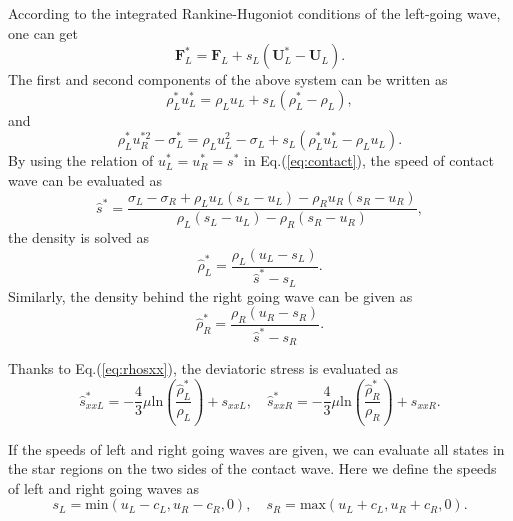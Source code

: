 \documentclass[review]{elsarticle}
\begin{document}
According to the integrated  Rankine-Hugoniot conditions of  the  left-going  wave, one can get
\begin{equation} \label{eq:RH1}
    \mathbf{F}_L^* = \mathbf{F}_L+s_L (\mathbf{U}_L^*-\mathbf{U}_L).
\end{equation}
The first and second components of the above system can be written as
\begin{equation} \label{eq:rhoLstar}
  \rho_L^* u_L^*=\rho_L u_L+s_L(\rho_L^*-\rho_L),
\end{equation}
and
\begin{equation}\label{eq:sigma}
  \rho_L^* u_R^{*2}-\sigma^*_L=\rho_L u_L^2-\sigma_L+s_L(\rho_L^* u_L^*-\rho_L u_L).
\end{equation}
By using the relation of $u_L^* =u_R^* = s^*$ in Eq.(\ref{eq:contact}), the speed of contact wave can be evaluated as
\begin{equation}
 \hat{s}^* = \frac{\sigma_L-\sigma_R+\rho_L u_L(s_L-u_L)-\rho_R u_R(s_R-u_R)}{\rho_L(s_L-u_L)-\rho_R(s_R-u_R)},
\end{equation}
the density is solved as
\begin{equation}\label{eq:rhoLs}
  \hat{\rho}_L^* = \frac{\rho_L(u_L-s_L)}{\hat{s}^*-s_L}.
\end{equation}
Similarly, the density behind the right going wave can be given as
\begin{equation}\label{eq:rhoLs}
  \hat{\rho}_R^* = \frac{\rho_R(u_R-s_R)}{\hat{s}^*-s_R}.
\end{equation}

Thanks to Eq.(\ref{eq:rhosxx}),  the deviatoric stress is evaluated as
\begin{equation}  \label{sxx1}
  \hat{s}_{xxL}^*=-\frac{4}{3}\mu\text{ln}(\frac{\hat{\rho}_L^*}{\rho_L})+s_{xxL}, \quad   \hat{s}_{xxR}^*=-\frac{4}{3}\mu\text{ln}(\frac{\hat{\rho}_R^*}{\rho_R})+s_{xxR}.
\end{equation}

If the speeds of left and right going waves are given, we can evaluate all states in the star regions on the two sides of  the contact wave. Here we define the speeds of left and right going waves as
    \begin{equation}\label{eq:sLR}
      s_L = \text{min} (u_L-c_L, u_R-c_R, 0),  \quad s_R = \text{max}(u_L+c_L, u_R+c_R, 0).
    \end{equation}
\end{document}
